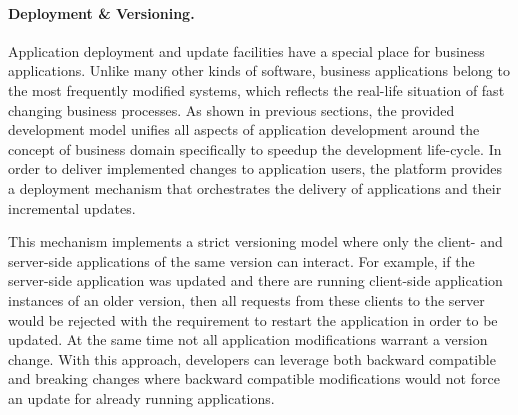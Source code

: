   \paragraph{Deployment \& Versioning.}
  Application deployment and update facilities have a special place for business applications.
  Unlike many other kinds of software, business applications belong to the most frequently modified systems, which reflects the real-life situation of fast changing business processes.
  As shown in previous sections, the provided development model unifies all aspects of application development around the concept of business domain specifically to speedup the development life-cycle.
  In order to deliver implemented changes to application users, the platform provides a deployment mechanism that orchestrates the delivery of applications and their incremental updates.
  
  This mechanism implements a strict versioning model where only the client- and server-side applications of the same version can interact.
  For example, if the server-side application was updated and there are running client-side application instances of an older version, then all requests from these clients to the server would be rejected with the requirement to restart the application in order to be updated.
  At the same time not all application modifications warrant a version change.
  With this approach, developers can leverage both backward compatible and breaking changes where backward compatible modifications would not force an update for already running applications.
  